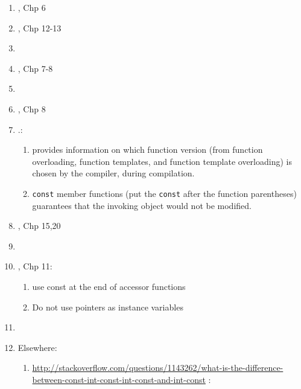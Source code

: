 \begin{enumerate}
\begin{enumerate}
\begin{enumerate}
\begin{enumerate}
			\end{enumerate}
		\end{enumerate}
	\item \cite{Lippman2013}, Chp 6
	\item \cite{Allain2012}, Chp 12-13
	\item \cite[Chp. 5, pp. 193--248; Chp. 7, pp. 307--349]{Horstmann2012}
	\item \cite{Prata2012}, Chp 7-8
	\item \cite[Chp. 4--5; \S11.1; and Chp. 14]{Savitch2009}
	\item \cite{Stroustrup2009}, Chp 8
	\item \cite[Chp. 7--8, pp. 279--391]{Prata2005}.: \vspace{-0.2cm}
		\begin{enumerate} \itemsep -2pt
		\item \cite[pp. 382--383]{Prata2005} provides information on which function version (from function overloading, function templates, and function template overloading) is chosen by the compiler, during compilation.
		\item {\tt const} member functions (put the {\tt const} after the function parentheses) guarantees that the invoking object would not be modified.
		\end{enumerate}
	\item \cite{Oualline2003}, Chp 15,20
	\item \cite[Chp. 6--8, pp. 105--179]{Schildt2003a}
	\item \cite{Eckel2000}, Chp 11: \vspace{-0.2cm}
		\begin{enumerate} \itemsep -2pt
		\item use const at the end of accessor functions
		\item Do not use pointers as instance variables
		\end{enumerate}
	\item \cite[Chp. 5--6; pp. 113--160]{Schildt1998a}
	\item Elsewhere: \vspace{-0.2cm}
		\begin{enumerate} \itemsep -2pt
		\item \url{http://stackoverflow.com/questions/1143262/what-is-the-difference-between-const-int-const-int-const-and-int-const} \cite{Mortensen2015}: \vspace{-0.1cm}
			\begin{enumerate} \itemsep -1pt

\end{enumerate}
\end{enumerate}
\end{enumerate}
\end{enumerate}
